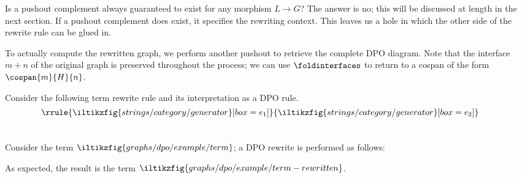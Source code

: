 Is a pushout complement always guaranteed to exist for any morphism \(L \to G\)?
The answer is no; this will be discussed at length in the next section.
If a pushout complement does exist, it specifies the rewriting context.
This leaves us a hole in which the other side of the rewrite rule can be glued
in.

\begin{center}
\end{center}

To actually compute the rewritten graph, we perform another pushout to retrieve
the complete DPO diagram.
Note that the interface \(m+n\) of the original graph is preserved throughout
the process; we can use \(\foldinterfaces\) to return to a cospan of the form
\(\cospan{m}{H}{n}\).

\begin{center}
\end{center}

\begin{example}
    Consider the following term rewrite rule and its interpretation as a DPO
    rule. \[
        \raisebox{2em}{\(\rrule{
                \iltikzfig{strings/category/generator}[box=e_1]
            }{
                \iltikzfig{strings/category/generator}[box=e_2]
            }\)}
        \qquad
        
    \]
    Consider the term \(
    \iltikzfig{graphs/dpo/example/term}
    \); a DPO rewrite is performed as follows:
    \begin{center}
        
    \end{center}
    As expected, the result is the term \(
    \iltikzfig{graphs/dpo/example/term-rewritten}
    \).
\end{example}
